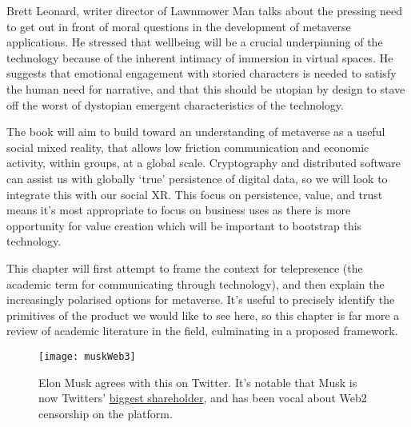 Brett Leonard, writer director of Lawnmower Man talks about the pressing need to get out in front of moral questions in the development of metaverse applications. He stressed that wellbeing will be a crucial underpinning of the technology because of the inherent intimacy of immersion in virtual spaces. He suggests that emotional engagement with storied characters is needed to satisfy the human need for narrative, and that this should be utopian by design to stave off the worst of dystopian emergent characteristics of the technology.\par



The book will aim to build toward an understanding of metaverse as a useful social mixed reality, that allows low friction communication and economic activity, within groups, at a global scale. Cryptography and distributed software can assist us with globally `true' persistence of digital data, so we will look to integrate this with our social XR.  This focus on persistence, value, and trust means it's most appropriate to focus on business uses as there is more opportunity for value creation which will be important to bootstrap this technology.\par
This chapter will first attempt to frame the context for telepresence (the academic term for communicating through technology), and then explain the increasingly polarised options for metaverse. It's useful to precisely identify the primitives of the product we would like to see here, so this chapter is far more a review of academic literature in the field, culminating in a proposed framework.\par
\begin{figure}
  \centering
    \texttt{[image: muskWeb3]}
  \caption{Elon Musk agrees with this on Twitter. It's notable that Musk is now Twitters' \href{https://twitter.com/paraga/status/1511320953598357505}{biggest shareholder}, and has been vocal about Web2 censorship on the platform.}
  \label{fig:muskWeb3}
\end{figure}
    
